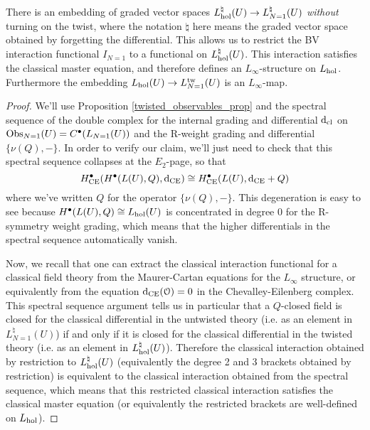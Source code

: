 \documentclass[10pt, oneside]{article}
\def\d{{\rm d}}
\begin{document}
\begin{prop}
There is an embedding of graded vector spaces $L_{\mathrm{hol}}^\natural(U) \to L^\natural_{N=1}(U)$ \emph{without} turning on the twist, where the notation $\natural$ here means the graded vector space obtained by forgetting the differential.  This allows us to restrict the BV interaction functional $I_{N=1}$ to a functional on $L_{\mathrm{hol}}^\natural(U)$.  This interaction satisfies the classical master equation, and therefore defines an $L_\infty$-structure on $L_{\mathrm{hol}}$.  Furthermore the embedding $L_{\mathrm{hol}}(U) \to L_{N=1}^{\mathrm{tw}}(U)$ is an $L_\infty$-map. 
\end{prop}

\begin{proof}
We'll use Proposition \ref{twisted_observables_prop} and the spectral sequence of the double complex for the internal grading and differential $\d_{\mr{cl}}$ on $\mathrm{Obs}_{N=1}(U) = C^\bullet(L_{N=1}(U))$ and the R-weight grading and differential $\{\nu(Q),-\}$.  In order to verify our claim, we'll just need to check that this spectral sequence collapses at the $E_2$-page, so that
\[H^\bullet_{\mr{CE}}(H^\bullet(L(U),Q), \d_{\mr{CE}}) \iso H^\bullet_{\mr{CE}}(L(U), \d_{\mr{CE}} + Q)\]
where we've written $Q$ for the operator $\{\nu(Q),-\}$. This degeneration is easy to see because $H^\bullet(L(U),Q) \cong L_{\mathrm{hol}}(U)$ is concentrated in degree 0 for the R-symmetry weight grading, which means that the higher differentials in the spectral sequence automatically vanish.

Now, we recall that one can extract the classical interaction functional for a classical field theory from the Maurer-Cartan equations for the $L_\infty$ structure, or equivalently from the equation $\d_{\mr{CE}}(\OO) = 0$ in the Chevalley-Eilenberg complex.  This spectral sequence argument tells us in particular that a $Q$-closed field is closed for the classical differential in the untwisted theory (i.e. as an element in $L^\natural_{N=1}(U)$) if and only if it is closed for the classical differential in the twisted theory (i.e. as an element in $L_{\mathrm{hol}}^\natural(U)$).  Therefore the classical interaction obtained by restriction to $L_{\mathrm{hol}}^\natural(U)$ (equivalently the degree 2 and 3 brackets obtained by restriction) is equivalent to the classical interaction obtained from the spectral sequence, which means that this restricted classical interaction satisfies the classical master equation (or equivalently the restricted brackets are well-defined on $L_{\mathrm{hol}}$).
\end{proof}
\end{document}
